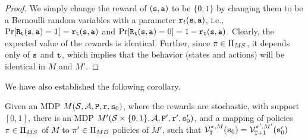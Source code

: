 \begin{proof}
We simply change the reward of $({\tt s},{\tt a})$ to be $\{0,1\}$ by
changing them to be a Bernoulli random variables with a parameter
${\tt r}_t({\tt s},{\tt a})$, i.e.,
$\Pr[{\tt R}_{\tt t}({\tt s},{\tt a})=1]={\tt r}_{\tt t}({\tt s},{\tt a})$
and
$\Pr[{\tt R}_{\tt t}({\tt s},{\tt a})=0]=1-{\tt r}_{\tt t}({\tt s},{\tt a})$.
Clearly, the expected value of the rewards is identical. Further,
since $\pi\in \Pi_{MS}$, it depends only of ${\tt s}$ and
${\tt t}$, which implies that the behavior (states and actions) will
be identical in $M$ and $M'$.
\end{proof}

We have also established the following corollary.

\begin{corollary}
Given an MDP $M(\mathcal{S},\mathcal{A},{\tt P},{\tt r},{\tt s}_0)$, where the
rewards are stochastic, with support $[0,1]$, there is an MDP
$M'(\mathcal{S}\times \{ 0,1\},\mathcal{A},{\tt P}',{\tt r}',{\tt s}'_0)$, and a
mapping of policies $\pi\in \Pi_{MS}$ of $M$ to $\pi'\in
\Pi_{MD}$ policies of $M'$, such that
$\mathcal{V}_{\tt T}^{\pi,M}({\tt s}_0)=\mathcal{V}_{{\tt T}+1}^{\pi',M'}({\tt s}'_0)$
\end{corollary}

%
%



